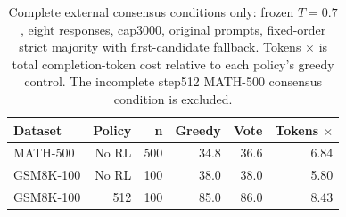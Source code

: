 \begin{table}[t]
\centering
\caption{Complete external consensus conditions only: frozen $T=0.7$, eight responses, cap3000, original prompts, fixed-order strict majority with first-candidate fallback. Tokens $\times$ is total completion-token cost relative to each policy's greedy control. The incomplete step512 MATH-500 consensus condition is excluded.}
\label{tab:external_selection}
\footnotesize
\setlength{\tabcolsep}{4pt}
\begin{tabular}{lrrrrr}
\toprule
Dataset & Policy & n & Greedy & Vote & Tokens $\times$\\
\midrule
MATH-500 & No RL & 500 & 34.8 & 36.6 & 6.84\\
GSM8K-100 & No RL & 100 & 38.0 & 38.0 & 5.80\\
GSM8K-100 & 512 & 100 & 85.0 & 86.0 & 8.43\\
\bottomrule
\end{tabular}
\end{table}
